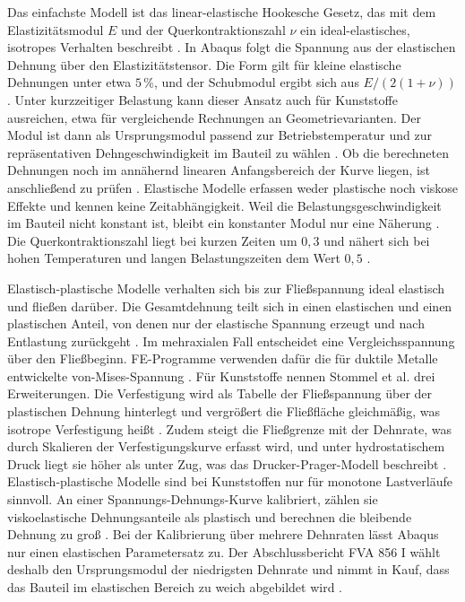 Das einfachste Modell ist das linear-elastische Hookesche Gesetz, das mit dem Elastizitätsmodul $E$ und der Querkontraktionszahl $\nu$ ein ideal-elastisches, isotropes Verhalten beschreibt \cite[S.~51]{Sto18}. In Abaqus folgt die Spannung aus der elastischen Dehnung über den Elastizitätstensor. Die Form gilt für kleine elastische Dehnungen unter etwa $5$\,\%, und der Schubmodul ergibt sich aus $E/(2(1+\nu))$ \cite{AbaqusLinElast25}. Unter kurzzeitiger Belastung kann dieser Ansatz auch für Kunststoffe ausreichen, etwa für vergleichende Rechnungen an Geometrievarianten. Der Modul ist dann als Ursprungsmodul passend zur Betriebstemperatur und zur repräsentativen Dehngeschwindigkeit im Bauteil zu wählen \cite[S.~51]{Sto18}. Ob die berechneten Dehnungen noch im annähernd linearen Anfangsbereich der Kurve liegen, ist anschließend zu prüfen \cite[S.~51 bis 52]{Sto18}. Elastische Modelle erfassen weder plastische noch viskose Effekte und kennen keine Zeitabhängigkeit. Weil die Belastungsgeschwindigkeit im Bauteil nicht konstant ist, bleibt ein konstanter Modul nur eine Näherung \cite[S.~52 bis 53]{Sto18}. Die Querkontraktionszahl liegt bei kurzen Zeiten um $0{,}3$ und nähert sich bei hohen Temperaturen und langen Belastungszeiten dem Wert $0{,}5$ \cite[S.~52]{Sto18}.

Elastisch-plastische Modelle verhalten sich bis zur Fließspannung ideal elastisch und fließen darüber. Die Gesamtdehnung teilt sich in einen elastischen und einen plastischen Anteil, von denen nur der elastische Spannung erzeugt und nach Entlastung zurückgeht \cite[S.~53]{Sto18}. Im mehraxialen Fall entscheidet eine Vergleichsspannung über den Fließbeginn. FE-Programme verwenden dafür die für duktile Metalle entwickelte von-Mises-Spannung \cite[S.~54]{Sto18}. Für Kunststoffe nennen Stommel et al. drei Erweiterungen. Die Verfestigung wird als Tabelle der Fließspannung über der plastischen Dehnung hinterlegt und vergrößert die Fließfläche gleichmäßig, was isotrope Verfestigung heißt \cite[S.~55]{Sto18}. Zudem steigt die Fließgrenze mit der Dehnrate, was durch Skalieren der Verfestigungskurve erfasst wird, und unter hydrostatischem Druck liegt sie höher als unter Zug, was das Drucker-Prager-Modell beschreibt \cite[S.~57 bis 59]{Sto18}. Elastisch-plastische Modelle sind bei Kunststoffen nur für monotone Lastverläufe sinnvoll. An einer Spannungs-Dehnungs-Kurve kalibriert, zählen sie viskoelastische Dehnungsanteile als plastisch und berechnen die bleibende Dehnung zu groß \cite[S.~56 bis 57]{Sto18}. Bei der Kalibrierung über mehrere Dehnraten lässt Abaqus nur einen elastischen Parametersatz zu. Der Abschlussbericht FVA 856 I wählt deshalb den Ursprungsmodul der niedrigsten Dehnrate und nimmt in Kauf, dass das Bauteil im elastischen Bereich zu weich abgebildet wird \cite[S.~63]{FVA856-I}.

